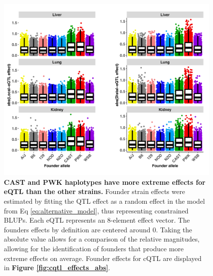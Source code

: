 \documentclass[9pt,twocolumn,twoside]{gsajnl}
\begin{document}
\begin{figure}[hp]
\renewcommand{\familydefault}{\sfdefault}\normalfont
\centering
\includegraphics[width=\textwidth, trim={0in 0in 0in 0in}, clip]{figs/all_eqtl_effects_abs.pdf}
\caption{\textbf{CAST and PWK haplotypes have more extreme effects for eQTL than the other strains.} Founder strain effects were estimated by fitting the QTL effect as a random effect in the model from Eq \ref{eq:alternative_model}, thus representing constrained BLUPs. Each eQTL represents an 8-element effect vector. The founders effects by definition are centered around 0. Taking the absolute value allows for a comparison of the relative magnitudes, allowing for the identification of founders that produce more extreme effects on average. Founder effects for cQTL are displayed in \textbf{Figure \ref{fig:cqtl_effects_abs}}.
\label{fig:eqtl_effects_abs}}
\end{figure}
\end{document}
